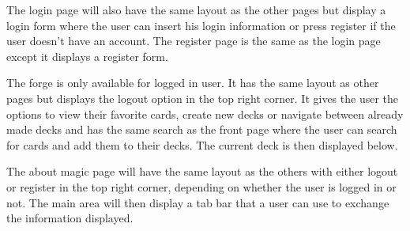 \documentclass[paper=a4, fontsize=11pt]{scrartcl} %
\numberwithin{equation}{section} %
\numberwithin{figure}{section} %
\numberwithin{table}{section} %
\begin{document}
The login page will also have the same layout as the other pages but display a login form where the user can insert his login information or press register if the user doesn’t have an account. The register page is the same as the login page except it displays a register form.
\begin{center}
\end{center}
The forge is only available for logged in user. It has the same layout as other pages but displays the logout option in the top right corner. It gives the user the options to view their favorite cards, create new decks or navigate between already made decks and has the same search as the front page where the user can search for cards and add them to their decks. The current deck is then displayed below.
\begin{center}
\end{center}
The about magic page will have the same layout as the others with either logout or register in the top right corner, depending on whether the user is logged in or not. The main area will then display a tab bar that a user can use to exchange the information displayed.
\end{document}
